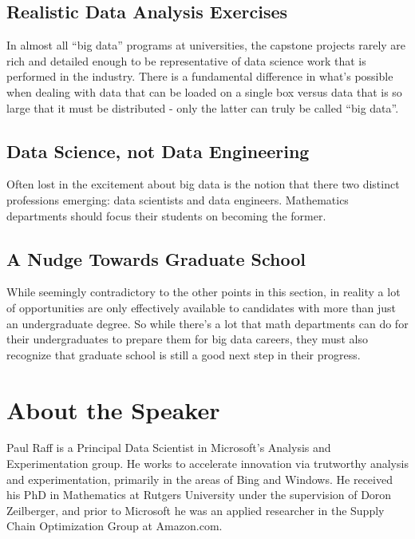 \documentclass[draft]{article}
\theoremstyle{definition}
\theoremstyle{remark}
\begin{document}
\subsection{Realistic Data Analysis Exercises}
In almost all ``big data'' programs at universities, the capstone projects rarely are rich and detailed enough to be representative of data science work that is performed in the industry. There is a fundamental difference in what's possible when dealing with data that can be loaded on a single box versus data that is so large that it must be distributed - only the latter can truly be called ``big data''. 

\subsection{Data Science, not Data Engineering}
Often lost in the excitement about big data is the notion that there two distinct professions emerging: data scientists and data engineers. Mathematics departments should focus their students on becoming the former. 

\subsection{A Nudge Towards Graduate School}
While seemingly contradictory to the other points in this section, in reality a lot of opportunities are only effectively available to candidates with more than just an undergraduate degree. So while there's a lot that math departments can do for their undergraduates to prepare them for big data careers, they must also recognize that graduate school is still a good next step in their progress. 

\section{About the Speaker}

Paul Raff is a Principal Data Scientist in Microsoft's Analysis and Experimentation group. He works to accelerate innovation via trutworthy analysis and experimentation, primarily in the areas of Bing and Windows. He received his PhD in Mathematics at Rutgers University under the supervision of Doron Zeilberger, and prior to Microsoft he was an applied researcher in the Supply Chain Optimization Group at Amazon.com. 
\end{document}
